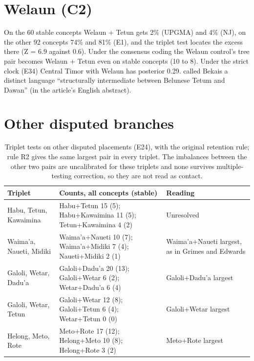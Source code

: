 \documentclass[11pt]{article}
\newcommand{\hd}[1]{\begin{minipage}[b]{\linewidth}\raggedright #1\end{minipage}}
\begin{document}
\section{Welaun (C2)}\label{sec:welaun}

On the 60 stable concepts Welaun + Tetun gets 2\% (UPGMA) and 4\% (NJ), on the other 92 concepts 74\% and 81\% (E1), and the triplet test locates the excess there (Z = 6.9 against 0.6). Under the consensus coding the Welaun control's tree pair becomes Welaun + Tetun even on stable concepts (10 to 8). Under the strict clock (E34) Central Timor with Welaun has posterior 0.29. \citet{hull2003} called Bekais a distinct language ``structurally intermediate between Belunese Tetum and Dawan'' (in the article's English abstract).

\section{Other disputed branches}\label{sec:branches}

\begin{table}[H]
\caption{Triplet tests on other disputed placements (E24), with the
original retention rule; rule R2 gives the same largest pair in every
triplet. The imbalances between the other two pairs are uncalibrated for
these triplets and none survives multiple-testing correction, so they
are not read as contact.}
\label{tab:branches}
\begin{tabularx}{\linewidth}{@{}L{0.6}L{1.543}L{0.857}@{}}
\toprule
\hd{Triplet} & \hd{Counts, all concepts (stable)} & \hd{Reading} \\
\midrule
Habu, Tetun, Kawaimina & Habu+Tetun 15 (5); Habu+Kawaimina 11 (5); Tetun+Kawaimina 4 (2) & Unresolved \\
Waima'a, Naueti, Midiki & Waima'a+Naueti 10 (7); Waima'a+Midiki 7 (4); Naueti+Midiki 2 (1) & Waima'a+Naueti largest, as in Grimes and Edwards \\
Galoli, Wetar, Dadu'a & Galoli+Dadu'a 20 (13); Galoli+Wetar 6 (2); Wetar+Dadu'a 6 (4) & Galoli+Dadu'a largest \\
Galoli, Wetar, Tetun & Galoli+Wetar 12 (8); Galoli+Tetun 6 (4); Wetar+Tetun 0 (0) & Galoli+Wetar largest \\
Helong, Meto, Rote & Meto+Rote 17 (12); Helong+Meto 10 (8); Helong+Rote 3 (2) & Meto+Rote largest \\
\bottomrule
\end{tabularx}
\end{table}
\end{document}
